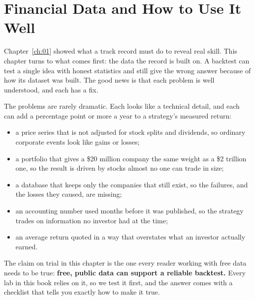 \makeatletter
{}
\makeatother

\chapter{Financial Data and How to Use It Well}
\label{ch:02}

Chapter~\ref{ch:01} showed what a track record must do to reveal real skill. This chapter turns to what comes first: the data the record is built on. A backtest can test a single idea with honest statistics and still give the wrong answer because of how its dataset was built. The good news is that each problem is well understood, and each has a fix.

The problems are rarely dramatic. Each looks like a technical detail, and each can add a percentage point or more a year to a strategy's measured return:

\begin{itemize}
  \item a price series that is not adjusted for stock splits and dividends, so ordinary corporate events look like gains or losses;
  \item a portfolio that gives a \$20 million company the same weight as a \$2 trillion one, so the result is driven by stocks almost no one can trade in size;
  \item a database that keeps only the companies that still exist, so the failures, and the losses they caused, are missing;
  \item an accounting number used months before it was published, so the strategy trades on information no investor had at the time;
  \item an average return quoted in a way that overstates what an investor actually earned.
\end{itemize}

The claim on trial in this chapter is the one every reader working with free data needs to be true: \textbf{free, public data can support a reliable backtest.} Every lab in this book relies on it, so we test it first, and the answer comes with a checklist that tells you exactly how to make it true.



